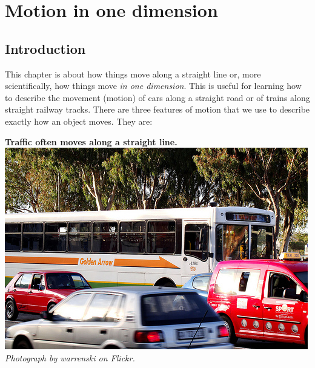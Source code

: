          \chapter{Motion in one dimension}\label{chap:motion}
    \label{804a55a564ee3ef49c7d42dbc9e03fae}
         \section{Introduction}
    \nopagebreak
 
\begin{minipage}{.5\textwidth}
      \label{m38787*id62184}This chapter is about how things move along a straight line or, more scientifically, how things move \textsl{in one dimension}. This is useful for learning how to describe the movement (motion) of cars along a straight road or of trains along straight railway tracks.  There are three features of motion that we use to describe exactly how an object moves. They are:\par
\end{minipage}
\begin{minipage}{.5\textwidth}
\begin{center}
\textbf{Traffic often moves along a straight line.}\\
 \includegraphics[width=.8\textwidth]{photos/trafficby_warrenski_flickr.jpg}\\
\textit{Photograph by warrenski on Flickr.}
\end{center}
\end{minipage}
   
